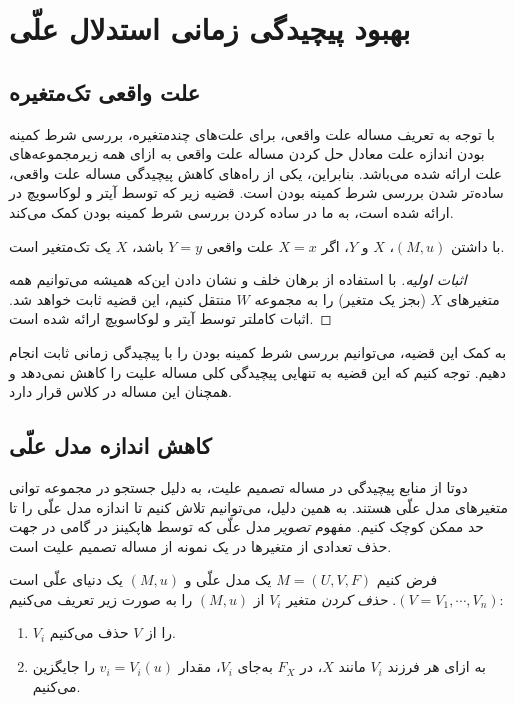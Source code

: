 \section{بهبود پیچیدگی زمانی استدلال علّی}\label{sec:improvements}

\subsection{علت واقعی تک‌متغیره}
با توجه به تعریف مساله علت واقعی،
برای علت‌های چندمتغیره، بررسی شرط کمینه بودن
اندازه علت معادل حل کردن مساله علت واقعی به ازای
همه زیرمجموعه‌های علت ارائه شده می‌باشد.
بنابراین، یکی از راه‌های کاهش پیچیدگی مساله علت واقعی،
ساده‌تر شدن بررسی شرط کمینه بودن است.
قضیه زیر که توسط آیتر و لوکاسویچ در
\cite{eiter2001complexity}
ارائه شده است، به ما در ساده کردن
بررسی شرط کمینه بودن کمک می‌کند.

\begin{theorem}\label{thm:causality-singleton}
  با داشتن
  $(M,u)$،
  $X$ و $Y$،
  اگر
  $X=x$
  علت واقعی
  $Y=y$ باشد،
  $X$
  یک تک‌متغیر است.
\end{theorem}

\begin{proof}[اثبات اولیه]
  با استفاده از برهان خلف و نشان دادن این‌که همیشه
  می‌توانیم همه متغیرهای
  $X$
  (بجز یک متغیر)
  را به مجموعه
  $W$
  منتقل کنیم، این قضیه ثابت خواهد شد.
  اثبات کاملتر توسط آیتر و لوکاسویچ ارائه شده است.
\end{proof}

به کمک این قضیه، می‌توانیم بررسی شرط کمینه بودن را
با پیچیدگی زمانی ثابت انجام دهیم.
توجه کنیم که این قضیه به تنهایی پیچیدگی کلی
مساله علیت را کاهش نمی‌دهد و همچنان این مساله در کلاس
قرار دارد.

\subsection{کاهش اندازه مدل علّی}

دوتا از منابع پیچیدگی در مساله تصمیم علیت،
به دلیل جستجو در مجموعه توانی متغیرهای مدل علّی هستند.
به همین دلیل، می‌توانیم تلاش کنیم تا اندازه مدل علّی را
تا حد ممکن کوچک کنیم. مفهوم
\textit{تصویر}
مدل علّی که توسط هاپکینز در
\cite{hopkins2002strategies}
گامی در جهت حذف تعدادی از متغیرها در
یک نمونه
از مساله تصمیم علیت است.

\begin{definition}\label{def:variable-deletion}
  فرض کنیم
  $M=(U,V,F)$
  یک مدل علّی و
  $(M,u)$
  یک دنیای علّی است
  $(V={V_1,\cdots,V_n})$.
  \textit{حذف کردن}
  متغیر
  $V_i$
  از
  $(M,u)$
  را به صورت زیر تعریف می‌کنیم:
  \begin{enumerate}[label=(\alph*)]
    \item $V_i$
    را از
    $V$
    حذف می‌کنیم.
    \item
    به ازای هر فرزند
    $V_i$
    مانند
    $X$،
    در
    $F_X$
    به‌جای
    $V_i$،
    مقدار
    $v_i=V_i(u)$
    را جایگزین می‌کنیم.
  \end{enumerate}
\end{definition}

